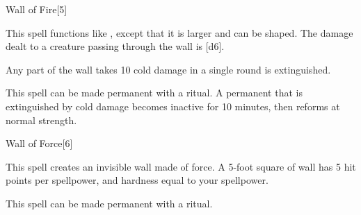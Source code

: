 \begin{spellsection}[Greater]{Wall of Fire}[5]
    \begin{spellheader}
    \end{spellheader}
    \begin{spellcontent}
        \begin{spelltargetinginfo}
        \end{spelltargetinginfo}
        \begin{spelleffects}
            \spellspecial This spell functions like , except that it is larger and can be shaped. The damage dealt to a creature passing through the wall is [d6].
            \spelldur \durshort
        \end{spelleffects}
    \end{spellcontent}
    \begin{spellfooter}
        \spellnotes Any part of the wall takes 10 cold damage in a single round is extinguished.

        This spell can be made permanent with a  ritual. A permanent  that is extinguished by cold damage becomes inactive for 10 minutes, then reforms at normal strength.
        \miscastexplode
    \end{spellfooter}
\end{spellsection}

\begin{spellsection}{Wall of Force}[6]
    \begin{spellheader}
    \end{spellheader}
    \begin{spellcontent}
        \begin{spelltargetinginfo}
        \end{spelltargetinginfo}
        \begin{spelleffects}
            \spelleffect This spell creates an invisible wall made of force. A 5-foot square of wall has 5 hit points per spellpower, and hardness equal to your spellpower.
            \spelldur \durshort \dismissable
        \end{spelleffects}
    \end{spellcontent}
    \begin{spellfooter}
        \spellnotes \forcespellnotes

        This spell can be made permanent with a  ritual.
        \miscastexplode
    \end{spellfooter}
\end{spellsection}

